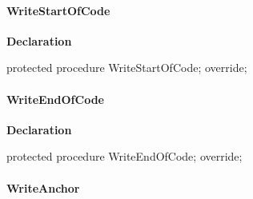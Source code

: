 \documentclass{report}
\newif\ifpdf
\begin{document}
\paragraph*{WriteStartOfCode}\hspace*{\fill}

\label{PasDoc_GenHtml.TGenericHTMLDocGenerator-WriteStartOfCode}
\begin{list}{}{
\setlength{\itemindent}{0cm}
\setlength{\listparindent}{0cm}
\setlength{\leftmargin}{\evensidemargin}
\addtolength{\leftmargin}{\tmplength}
\settowidth{\labelsep}{X}
\addtolength{\leftmargin}{\labelsep}
\setlength{\labelwidth}{\tmplength}
}
\item[\textbf{Declaration}\hfill]
\ifpdf
\begin{flushleft}
\fi
\begin{ttfamily}
protected procedure WriteStartOfCode; override;\end{ttfamily}

\ifpdf
\end{flushleft}
\fi

\end{list}
\paragraph*{WriteEndOfCode}\hspace*{\fill}

\label{PasDoc_GenHtml.TGenericHTMLDocGenerator-WriteEndOfCode}
\begin{list}{}{
\setlength{\itemindent}{0cm}
\setlength{\listparindent}{0cm}
\setlength{\leftmargin}{\evensidemargin}
\addtolength{\leftmargin}{\tmplength}
\settowidth{\labelsep}{X}
\addtolength{\leftmargin}{\labelsep}
\setlength{\labelwidth}{\tmplength}
}
\item[\textbf{Declaration}\hfill]
\ifpdf
\begin{flushleft}
\fi
\begin{ttfamily}
protected procedure WriteEndOfCode; override;\end{ttfamily}

\ifpdf
\end{flushleft}
\fi

\end{list}
\paragraph*{WriteAnchor}\hspace*{\fill}
\end{document}
